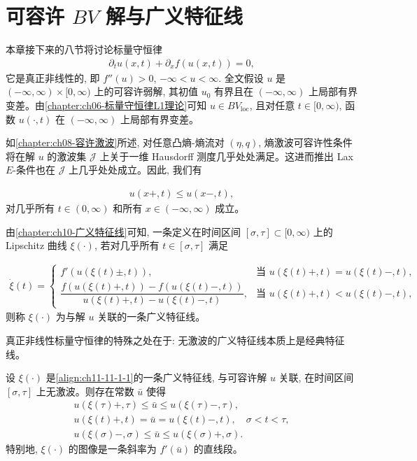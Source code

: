 \documentclass[../../main.tex]{subfiles}
\begin{document}
\section{可容许 $BV$ 解与广义特征线}\label{section:ch11-可容许BV解与广义特征线}

本章接下来的八节将讨论标量守恒律
\begin{align}
\partial_t u(x,t)+\partial_x f(u(x,t))=0,\label{align:ch11-11-1-1}
\end{align}
它是真正非线性的, 即 $f''(u)>0$, $-\infty<u<\infty$. 全文假设 $u$ 是 $(-\infty,\infty)\times[0,\infty)$ 上的可容许弱解, 其初值 $u_0$ 有界且在 $(-\infty,\infty)$ 上局部有界变差。由\cref{chapter:ch06-标量守恒律L1理论}可知 $u\in BV_{\mathrm{loc}}$, 且对任意 $t\in[0,\infty)$, 函数 $u(\cdot,t)$ 在 $(-\infty,\infty)$ 上局部有界变差。


如\cref{chapter:ch08-容许激波}所述, 对任意凸熵-熵流对 $(\eta,q)$, 熵激波可容许性条件将在解 $u$ 的激波集 $\mathscr{J}$ 上关于一维 Hausdorff 测度几乎处处满足。这进而推出 Lax $E$-条件也在 $\mathscr{J}$ 上几乎处处成立。因此, 我们有

\begin{align}
u(x+,t)\leqslant u(x-,t),\label{align:ch11-11-1-2}
\end{align}
对几乎所有 $t\in(0,\infty)$ 和所有 $x\in(-\infty,\infty)$ 成立。

由\cref{chapter:ch10-广义特征线}可知, 一条定义在时间区间 $[\sigma,\tau]\subset[0,\infty)$ 上的 Lipschitz 曲线 $\xi(\cdot)$, 若对几乎所有 $t\in[\sigma,\tau]$ 满足

\begin{align}
\dot{\xi}(t)=
\begin{cases}
f'(u(\xi(t)\pm,t)), & \text{当 }u(\xi(t)+,t)=u(\xi(t)-,t),\\[2mm]
\dfrac{f(u(\xi(t)+,t))-f(u(\xi(t)-,t))}{u(\xi(t)+,t)-u(\xi(t)-,t)}, & \text{当 }u(\xi(t)+,t)<u(\xi(t)-,t),
\end{cases}\label{align:ch11-11-1-3}
\end{align}
则称 $\xi(\cdot)$ 为与解 $u$ 关联的一条广义特征线。

真正非线性标量守恒律的特殊之处在于: 无激波的广义特征线本质上是经典特征线。

\begin{theorem}\label{theorem:ch11-11-1}
设 $\xi(\cdot)$ 是\eqref{align:ch11-11-1-1}的一条广义特征线, 与可容许解 $u$ 关联, 在时间区间 $[\sigma,\tau]$ 上无激波。则存在常数 $\bar u$ 使得
\begin{align}
u(\xi(\tau)+,\tau)\leqslant\bar u\leqslant u(\xi(\tau)-,\tau),\label{align:ch11-11-1-4}\\
u(\xi(t)+,t)=\bar u=u(\xi(t)-,t),\quad \sigma<t<\tau,\label{align:ch11-11-1-5}\\
u(\xi(\sigma)-,\sigma)\leqslant\bar u\leqslant u(\xi(\sigma)+,\sigma).\label{align:ch11-11-1-6}
\end{align}
特别地, $\xi(\cdot)$ 的图像是一条斜率为 $f'(\bar u)$ 的直线段。
\end{theorem}
\end{document}
